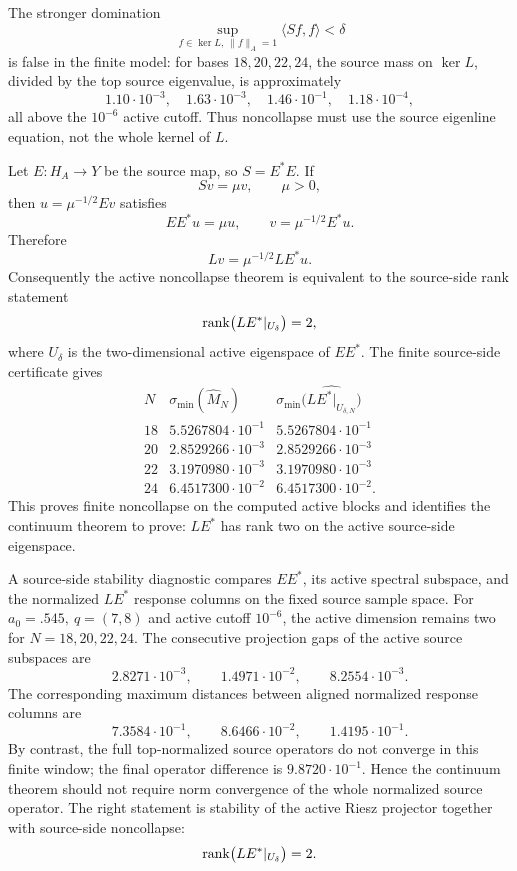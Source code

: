 \documentclass[11pt]{article}
\begin{document}
The stronger domination
\[
  \sup_{f\in\ker L,\ \|f\|_A=1}\langle Sf,f\rangle < \delta
\]
is false in the finite model: for bases \(18,20,22,24\), the source mass on
\(\ker L\), divided by the top source eigenvalue, is approximately
\[
  1.10\cdot10^{-3},\quad
  1.63\cdot10^{-3},\quad
  1.46\cdot10^{-1},\quad
  1.18\cdot10^{-4},
\]
all above the \(10^{-6}\) active cutoff.  Thus noncollapse must use the source
eigenline equation, not the whole kernel of \(L\).

Let \(E:H_A\to Y\) be the source map, so \(S=E^\ast E\).  If
\[
  Sv=\mu v,\qquad \mu>0,
\]
then \(u=\mu^{-1/2}Ev\) satisfies
\[
  EE^\ast u=\mu u,\qquad v=\mu^{-1/2}E^\ast u.
\]
Therefore
\[
  Lv=\mu^{-1/2}LE^\ast u.
\]
Consequently the active noncollapse theorem is equivalent to the source-side
rank statement
\[
  {\rm rank}\bigl(LE^\ast|_{U_\delta}\bigr)=2,
\]
where \(U_\delta\) is the two-dimensional active eigenspace of \(EE^\ast\).
The finite source-side certificate gives
\[
\begin{array}{c|c|c}
N&\sigma_{\min}(\widehat M_N)&
\sigma_{\min}\bigl(\widehat{LE^\ast|_{U_{\delta,N}}}\bigr)\\\hline
18&5.5267804\cdot10^{-1}&5.5267804\cdot10^{-1}\\
20&2.8529266\cdot10^{-3}&2.8529266\cdot10^{-3}\\
22&3.1970980\cdot10^{-3}&3.1970980\cdot10^{-3}\\
24&6.4517300\cdot10^{-2}&6.4517300\cdot10^{-2}.
\end{array}
\]
This proves finite noncollapse on the computed active blocks and identifies the
continuum theorem to prove: \(LE^\ast\) has rank two on the active source-side
eigenspace.

A source-side stability diagnostic compares \(EE^\ast\), its active spectral
subspace, and the normalized \(LE^\ast\) response columns on the fixed source
sample space.  For \(a_0=.545,\ q=(7,8)\) and active cutoff \(10^{-6}\), the
active dimension remains two for \(N=18,20,22,24\).  The consecutive projection
gaps of the active source subspaces are
\[
  2.8271\cdot10^{-3},\qquad
  1.4971\cdot10^{-2},\qquad
  8.2554\cdot10^{-3}.
\]
The corresponding maximum distances between aligned normalized response
columns are
\[
  7.3584\cdot10^{-1},\qquad
  8.6466\cdot10^{-2},\qquad
  1.4195\cdot10^{-1}.
\]
By contrast, the full top-normalized source operators do not converge in this
finite window; the final operator difference is \(9.8720\cdot10^{-1}\).  Hence
the continuum theorem should not require norm convergence of the whole
normalized source operator.  The right statement is stability of the active
Riesz projector together with source-side noncollapse:
\[
  {\rm rank}\bigl(LE^\ast|_{U_\delta}\bigr)=2.
\]
\end{document}
